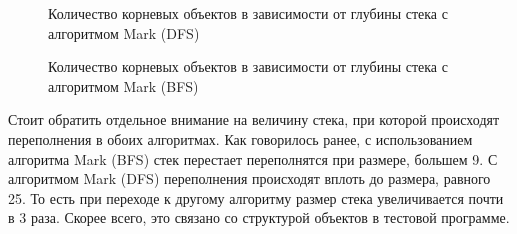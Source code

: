    \begin{figure}[p!]   
   \caption{Количество корневых объектов в зависимости от глубины стека с алгоритмом Mark (DFS)}
   \label{ris:dm}   
   \caption{Количество корневых объектов в зависимости от глубины стека с алгоритмом Mark (BFS)}
   \label{ris:bm}   
   \end{figure}


Стоит обратить отдельное внимание на величину стека, при которой происходят переполнения в обоих алгоритмах. Как говорилось ранее, с использованием алгоритма
Mark (BFS) стек перестает переполнятся при размере, большем 9. С алгоритмом Mark (DFS) переполнения происходят вплоть до размера, равного 25. То есть при переходе 
к другому алгоритму размер стека увеличивается почти в 3 раза. Скорее всего, это связано со структурой объектов в тестовой программе. 

